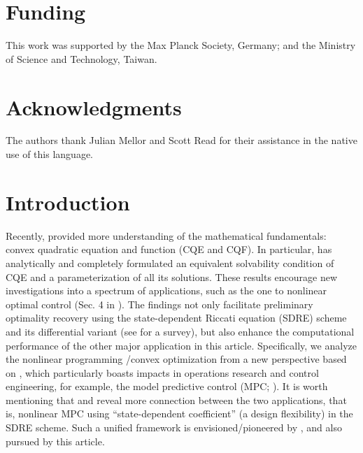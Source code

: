 \documentclass{imaman}
\numberwithin{equation}{section}
\begin{document}
\section*{Funding}
This work was supported by the Max Planck Society, Germany; and the Ministry of Science and Technology, Taiwan.

\section*{Acknowledgments}
The authors thank Julian Mellor and Scott Read for their assistance in the native use of this language.


\newpage
\setcounter{page}{1}

\section{Introduction}
\label{Sec_Intro}
Recently, \cite{LiLiHs:20} provided more understanding of the mathematical fundamentals: convex quadratic equation and function (CQE and CQF). In particular, \cite{LiLiHs:20} has analytically and completely formulated an equivalent solvability condition of CQE and a parameterization of all its solutions. These results encourage new investigations into a spectrum of applications, such as the one to nonlinear optimal control (Sec. 4 in \cite{LiLiHs:20}). The findings not only facilitate preliminary optimality recovery using the state-dependent Riccati equation (SDRE) scheme and its differential variant (see \cite{Cim:10} for a survey), but also enhance the computational performance of the other major application in this article. Specifically, we analyze the nonlinear programming \citep{Lu(Ye):03(16)}/convex optimization \citep{BoVa:04} from a new perspective based on \cite{LiLiHs:20}, which particularly boasts impacts in operations research and control engineering, for example, the model predictive control (MPC; \cite{CiFa:12}). It is worth mentioning that \cite{KaWaLiShPe:18} and \cite{QuSu:18} reveal more connection between the two applications, that is, nonlinear MPC using ``state-dependent coefficient'' (a design flexibility) in the SDRE scheme. Such a unified framework is envisioned/pioneered by \cite{BeMoDuPi:02}, and also pursued by this article.
\end{document}
